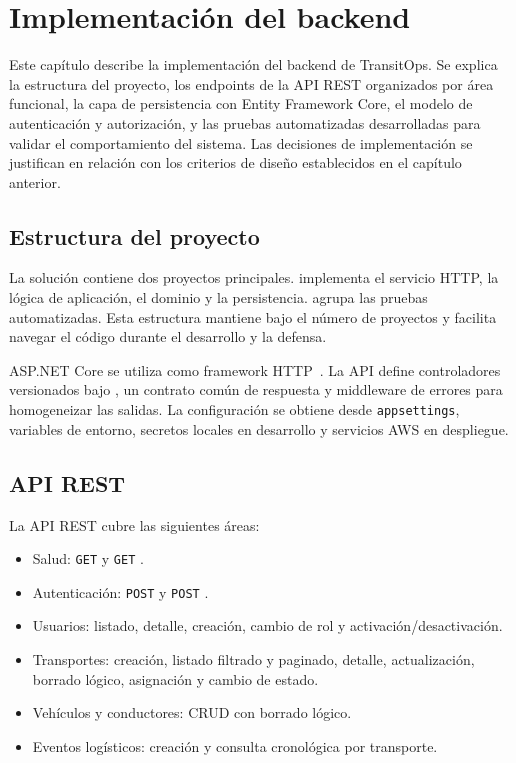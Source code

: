 \chapter{Implementación del backend}
\label{chap:implementacion-backend}

Este capítulo describe la implementación del backend de TransitOps. Se explica la estructura del proyecto, los endpoints de la API REST organizados por área funcional, la capa de persistencia con Entity Framework Core, el modelo de autenticación y autorización, y las pruebas automatizadas desarrolladas para validar el comportamiento del sistema. Las decisiones de implementación se justifican en relación con los criterios de diseño establecidos en el capítulo anterior.

\section{Estructura del proyecto}
\label{sec:estructura-proyecto}

La solución contiene dos proyectos principales.  implementa el servicio HTTP, la lógica de aplicación, el dominio y la persistencia.  agrupa las pruebas automatizadas. Esta estructura mantiene bajo el número de proyectos y facilita navegar el código durante el desarrollo y la defensa.

ASP.NET Core se utiliza como framework HTTP~\cite{MicrosoftAspNetCoreDocs}. La API define controladores versionados bajo , un contrato común de respuesta y middleware de errores para homogeneizar las salidas. La configuración se obtiene desde \texttt{appsettings}, variables de entorno, secretos locales en desarrollo y servicios AWS en despliegue.

\section{API REST}
\label{sec:api-rest}

La API REST cubre las siguientes áreas:

\begin{itemize}
  \item Salud: \texttt{GET}  y \texttt{GET} .
  \item Autenticación: \texttt{POST}  y \texttt{POST} .
  \item Usuarios: listado, detalle, creación, cambio de rol y activación/desactivación.
  \item Transportes: creación, listado filtrado y paginado, detalle, actualización, borrado lógico, asignación y cambio de estado.
  \item Vehículos y conductores: CRUD con borrado lógico.
  \item Eventos logísticos: creación y consulta cronológica por transporte.
\end{itemize}

